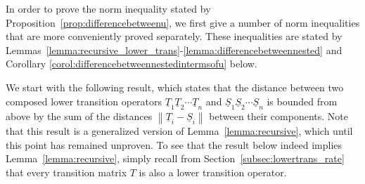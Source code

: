 \documentclass[10pt,a4paper]{paper}
\theoremstyle{definition}
\newcommand{\lt}{\underline{T}}
\newcommand{\norm}[1]{\left\lVert #1 \right\rVert}
\begin{document}
In order to prove the norm inequality stated by Proposition~\ref{prop:differencebetweenu}, we first give a number of norm inequalities that are more conveniently proved separately. These inequalities are stated by Lemmas~\ref{lemma:recursive_lower_trans}-\ref{lemma:differencebetweennested} and Corollary \ref{corol:differencebetweennestedintermsofu} below.

We start with the following result, which states that the distance between two composed lower transition operators $\lt_1\lt_2\cdots\lt_n$ and $\underline{S}_1\underline{S}_2\cdots\underline{S}_n$ is bounded from above by the sum of the distances $\norm{\lt_i - \underline{S}_i}$ between their components. Note that this result is a generalized version of Lemma~\ref{lemma:recursive}, which until this point has remained unproven. To see that the result below indeed implies Lemma~\ref{lemma:recursive}, simply recall from Section~\ref{subsec:lowertrans_rate} that every transition matrix $T$ is also a lower transition operator.
\end{document}
